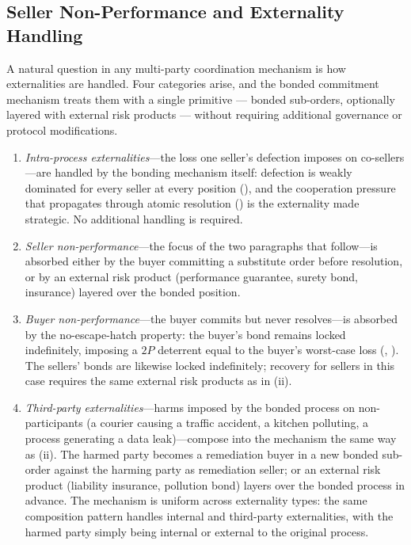 \documentclass[11pt,a4paper]{article}
\theoremstyle{definition}
\theoremstyle{remark}
\newcommand{\pay}{P}           %
\begin{document}
\subsection{Seller Non-Performance and Externality Handling}
\label{sec:externalities}

A natural question in any multi-party coordination mechanism is how
externalities are handled. Four categories arise, and the bonded
commitment mechanism treats them with a single primitive ---
bonded sub-orders, optionally layered with external risk products
--- without requiring additional governance or protocol
modifications.

\begin{enumerate}[label=(\roman*)]
  \item \emph{Intra-process externalities}---the loss one seller's
    defection imposes on co-sellers---are handled by the bonding
    mechanism itself: defection is weakly dominated for every seller
    at every position (), and the cooperation
    pressure that propagates through atomic resolution
    () is the externality made
    strategic. No additional handling is required.
  \item \emph{Seller non-performance}---the focus of the two
    paragraphs that follow---is absorbed either by the buyer
    committing a substitute order before resolution, or by an
    external risk product (performance guarantee, surety bond,
    insurance) layered over the bonded position.
  \item \emph{Buyer non-performance}---the buyer commits but
    never resolves---is absorbed by the no-escape-hatch property:
    the buyer's bond remains locked indefinitely, imposing a
    $2\pay$ deterrent equal to the buyer's worst-case loss
    (, ). The
    sellers' bonds are likewise locked indefinitely; recovery for
    sellers in this case requires the same external risk products
    as in (ii).
  \item \emph{Third-party externalities}---harms imposed by the
    bonded process on non-participants (a courier causing a
    traffic accident, a kitchen polluting, a process generating
    a data leak)---compose into the mechanism the same way as
    (ii). The harmed party becomes a remediation buyer in a new
    bonded sub-order against the harming party as remediation
    seller; or an external risk product (liability insurance,
    pollution bond) layers over the bonded process in advance.
    The mechanism is uniform across externality types: the same
    composition pattern handles internal and third-party
    externalities, with the harmed party simply being internal
    or external to the original process.
\end{enumerate}
\end{document}
